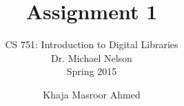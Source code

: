 \documentclass[envcountsame,envcountchap]{svmono}
\begin{document}
\author{Khaja Masroor Ahmed}
\title{Assignment 1}

\subtitle{CS 751:  Introduction to Digital Libraries\\Dr. Michael Nelson\\Spring 2015}

\maketitle

\frontmatter

\tableofcontents

\mainmatter



\backmatter



\nocite{*}
\end{document}
